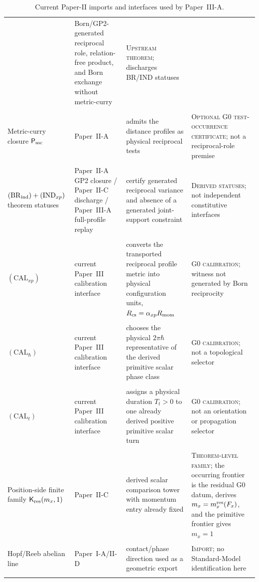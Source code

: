 \documentclass[12pt,a4paper]{article}
\begin{document}
\begin{table}[H]
\begin{tabular}{@{}L{3.1cm}L{3.6cm}L{4.0cm}L{4.0cm}@{}}
& Born/GP2-generated reciprocal role, relation-free product, and Born exchange without metric-curry
& \textsc{Upstream theorem}; discharges BR/IND statuses \\\\
Metric-curry closure $\mathsf P_{\rm mc}$
& Paper~II-A
& admits the distance profiles as physical reciprocal tests
& \textsc{Optional G0 test-occurrence certificate}; not a reciprocal-role premise \\\\
$(\mathrm{BR}_{\rm ind})+(\mathrm{IND}_{xp})$ theorem statuses
& Paper~II-A GP2 closure / Paper~II-C discharge / Paper~III-A full-profile replay
& certify generated reciprocal variance and absence of a generated joint-support constraint
& \textsc{Derived statuses}; not independent constitutive interfaces \\\\
$(\mathrm{CAL}_{xp})$
& current Paper~III calibration interface
& converts the transported reciprocal profile metric into physical configuration units, $R_{\mathrm{cs}}=\alpha_{xp}R_{\mathrm{mom}}$
& \textsc{G0 calibration}; witness not generated by Born reciprocity \\\\
$(\mathrm{CAL}_{\hbar})$
& current Paper~III calibration interface
& chooses the physical $2\pi\hbar$ representative of the derived primitive scalar phase class
& \textsc{G0 calibration}; not a topological selector \\\\
$(\mathrm{CAL}_{t})$
& current Paper~III calibration interface
& assigns a physical duration $T_t>0$ to one already derived positive primitive scalar turn
& \textsc{G0 calibration}; not an orientation or propagation selector \\\\
Position-side finite family $\mathsf K_{\rm res}(m_x,1)$
& Paper~II-C
& derived scalar comparison tower with momentum entry already fixed
& \textsc{Theorem-level family}; the occurring frontier is the residual G0 datum, derives $m_x=m_x^{\rm res}(F_x)$, and the primitive frontier gives $m_x=1$ \\\\
Hopf/Reeb abelian line
& Paper~I-A/II-D
& contact/phase direction used as a geometric export
& \textsc{Import}; no Standard-Model identification here \\\\
\bottomrule
\end{tabular}
\caption[Paper-II imports used by Paper~III-A]{Current Paper-II imports and interfaces used by Paper~III-A.}
\label{tab:p3-paperii-import-ledger}
\endgroup
\end{table}
\end{document}
